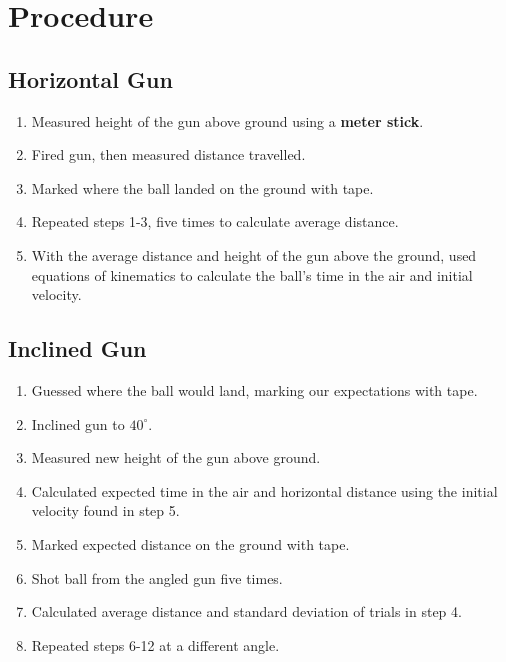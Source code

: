 
\section{Procedure}
\vspace{-0.5cm}
\singlespacing



\subsection{Horizontal Gun}

	\begin{enumerate}
		\item Measured height of the gun above ground using a \textbf{meter stick}.
		\item Fired gun, then measured distance travelled. 
		\item Marked where the ball landed on the ground with tape.
		\item Repeated steps 1-3, five times to calculate average distance.
		\item With the average distance and height of the gun above the ground, used equations of kinematics to calculate the ball's time in the air and initial velocity.
	\end{enumerate}	

\subsection{Inclined Gun}

	\begin{enumerate}[resume]
		\item Guessed where the ball would land, marking our expectations with tape.
		\item Inclined gun to  $40^\circ$.
		\item Measured new height of the gun above ground.
		\item Calculated expected time in the air and horizontal distance using the initial velocity found in step 5.
		\item Marked expected distance on the ground with tape.
		\item Shot ball from the angled gun five times.
		\item Calculated average distance and standard deviation of trials in step 4.
		\item Repeated steps 6-12 at a different angle.
	\end{enumerate}

\newpage




